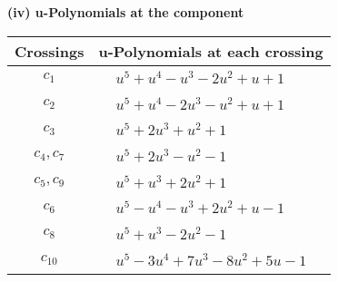 \documentclass[1p]{elsarticle_modified}
\theoremstyle{definition}
\begin{document}
\newpage\renewcommand{\arraystretch}{1}
\flushleft \textbf{(iv) u-Polynomials at the component}\newline \\
\begin{tabular}{m{50pt}|m{274pt}}
Crossings & \hspace{64pt}u-Polynomials at each crossing \\
\hline $$\begin{aligned}c_{1}\end{aligned}$$&$\begin{aligned}
&u^5+u^4- u^3-2 u^2+u+1
\end{aligned}$\\
\hline $$\begin{aligned}c_{2}\end{aligned}$$&$\begin{aligned}
&u^5+u^4-2 u^3- u^2+u+1
\end{aligned}$\\
\hline $$\begin{aligned}c_{3}\end{aligned}$$&$\begin{aligned}
&u^5+2 u^3+u^2+1
\end{aligned}$\\
\hline $$\begin{aligned}c_{4},c_{7}\end{aligned}$$&$\begin{aligned}
&u^5+2 u^3- u^2-1
\end{aligned}$\\
\hline $$\begin{aligned}c_{5},c_{9}\end{aligned}$$&$\begin{aligned}
&u^5+u^3+2 u^2+1
\end{aligned}$\\
\hline $$\begin{aligned}c_{6}\end{aligned}$$&$\begin{aligned}
&u^5- u^4- u^3+2 u^2+u-1
\end{aligned}$\\
\hline $$\begin{aligned}c_{8}\end{aligned}$$&$\begin{aligned}
&u^5+u^3-2 u^2-1
\end{aligned}$\\
\hline $$\begin{aligned}c_{10}\end{aligned}$$&$\begin{aligned}
&u^5-3 u^4+7 u^3-8 u^2+5 u-1
\end{aligned}$\\
\hline
\end{tabular}\\~\\
\end{document}
